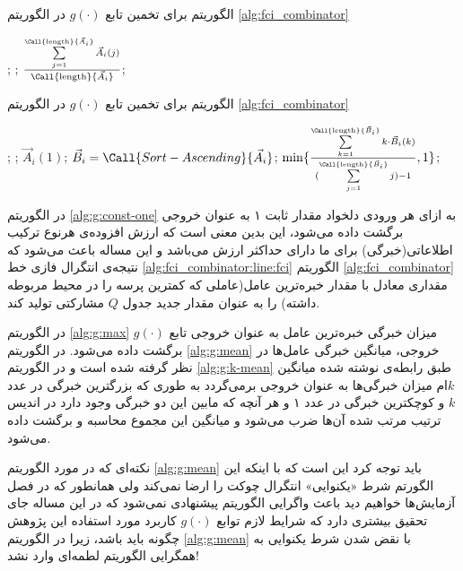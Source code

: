 \begin{algorithm}[t]
\caption{الگوریتم  برای تخمین تابع $g(\cdot)$ در الگوریتم \ref{alg:fci_combinator}}\label{alg:g:mean}
\begin{latin}
\begin{algorithmic}[1]
		\State {};
		\State {};
	\Else
		\State \Return ${\sum\limits_{j=1}^{\Call{\text{length}}{\vec{A}_i}} \vec{A}_i(j) \over \Call{\text{length}}{\vec{A}_i}}$;
	\EndIf
\EndFunction
\end{algorithmic}
\end{latin}
\end{algorithm}

\begin{algorithm}[t]
\caption{الگوریتم  برای تخمین تابع $g(\cdot)$ در الگوریتم \ref{alg:fci_combinator}}\label{alg:g:k-mean}
\begin{latin}
\begin{algorithmic}[1]
		\State {};
		\State {};
		\State \Return $\vec{A}_i(1)$;
	\Else
		\State $\vec{B}_i = \Call{Sort-Ascending}{\vec{A}_i}$;
		\State \Return $\min\{{\sum\limits_{k = 1}^{\Call{\text{length}}{\vec{B}_i}}  k \cdot \vec{B}_i(k) \over {(\sum\limits_{j=1}^{\Call{\text{length}}{\vec{B}_i}} j) - 1}}, 1\}$;
	\EndIf
\EndFunction
\end{algorithmic}
\end{latin}
\end{algorithm}

در الگوریتم \ref{alg:g:const-one} به ازای هر ورودی دلخواد مقدار ثابت ۱ به عنوان خروجی برگشت داده می‌شود، این بدین معنی است که ارزش افزوده‌ی هرنوع ترکیب اطلاعاتی(خبرگی) برای ما دارای حداکثر ارزش می‌باشد و این مساله باعث می‌شود که نتیجه‌ی انتگرال فازی خط \ref{alg:fci_combinator:line:fci} الگوریتم \ref{alg:fci_combinator} مقداری معادل با مقدار خبره‌ترین عامل(عاملی که کمترین پرسه را در محیط مربوطه داشته) را به عنوان مقدار جدید جدول $Q$ مشارکتی تولید کند.

در الگوریتم \ref{alg:g:max} میزان خبرگی خبره‌ترین عامل به عنوان خروجی تابع $g(\cdot)$ برگشت داده می‌شود. در الگوریتم \ref{alg:g:mean} خروجی، میانگین خبرگی عامل‌ها در نظر گرفته شده است و در الگوریتم \ref{alg:g:k-mean} طبق رابطه‌ی نوشته شده میانگین $k$ام میزان خبرگی‌ها به عنوان خروجی برمی‌گردد به طوری که بزرگترین خبرگی در عدد $k$ و کوچکترین خبرگی در عدد ۱ و هر آنچه که مابین این دو خبرگی وجود دارد در اندیس ترتیب مرتب شده آن‌ها ضرب می‌شود و میانگین این مجموع محاسبه و برگشت داده می‌شود.

نکته‌ای که در مورد الگوریتم \ref{alg:g:mean} باید توجه کرد این است که با اینکه این الگورتم شرط «یکنوایی» انتگرال چوکت را ارضا نمی‌کند ولی همانطور که در فصل آزمایش‌ها خواهیم دید باعث واگرایی الگوریتم پیشنهادی نمی‌شود که در این مساله جای تحقیق بیشتری دارد که شرایط لازم توابع $g(\cdot)$ کاربرد مورد استفاده این پژوهش چگونه باید باشد، زیرا در الگوریتم \ref{alg:g:mean} با نقض شدن شرط یکنوایی به همگرایی الگوریتم لطمه‌ای وارد نشد!